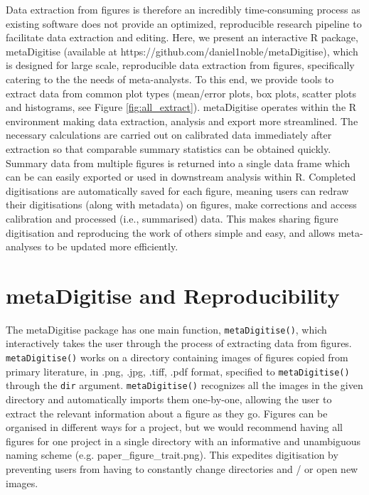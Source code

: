 \documentclass[12pt]{article}
\newcommand{\code}[1]{\texttt{#1}}
\newcommand{\fct}[1]{\texttt{#1()}}
\newcommand{\pkg}[1]{{\fontseries{b}\selectfont #1}}
\let\proglang=\textsf
\begin{document}
Data extraction from figures is therefore an incredibly time-consuming process as existing software does not provide an optimized, reproducible research pipeline to facilitate data extraction and editing. Here, we present an interactive \proglang{R} package, \pkg{metaDigitise} (available at https://github.com/daniel1noble/metaDigitise), which is designed for large scale, reproducible data extraction from figures, specifically catering to the the needs of meta-analysts. To this end, we provide tools to extract data from common plot types (mean/error plots, box plots, scatter plots and histograms, see Figure \ref{fig:all_extract}). \pkg{metaDigitise} operates within the \proglang{R} environment making data extraction, analysis and export more streamlined. The necessary calculations are carried out on calibrated data immediately after extraction so that comparable summary statistics can be obtained quickly. Summary data from multiple figures is returned into a single data frame which can be can easily exported or used in downstream analysis within \proglang{R}. Completed digitisations are automatically saved for each figure, meaning users can redraw their digitisations (along with metadata) on figures, make corrections and access calibration and processed (i.e., summarised) data. This makes sharing figure digitisation and reproducing the work of others simple and easy, and allows meta-analyses to be updated more efficiently.




\section{\pkg{metaDigitise} and Reproducibility}
The \pkg{metaDigitise} package has one main function, \fct{metaDigitise}, which interactively takes the user through the process of extracting data from figures. \fct{metaDigitise} works on a directory containing images of figures copied from primary literature, in .png, .jpg, .tiff, .pdf format, specified to \fct{metaDigitise} through the \code{dir} argument. \fct{metaDigitise} recognizes all the images in the given directory and automatically imports them one-by-one, allowing the user to extract the relevant information about a figure as they go. Figures can be organised in different ways for a project, but we would recommend having all figures for one project in a single directory with an informative and unambiguous naming scheme (e.g. paper\_figure\_trait.png). This expedites digitisation by preventing users from having to constantly change directories and / or open new images. 
\end{document}
